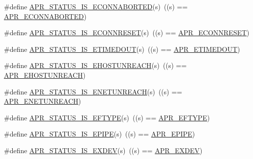 \begin{DoxyCompactItemize}
\item 
\#define \mbox{\hyperlink{group___a_p_r___s_t_a_t_u_s___i_s_ga528a8032b13c75fbdeb9bf7e4c0be493}{A\+P\+R\+\_\+\+S\+T\+A\+T\+U\+S\+\_\+\+I\+S\+\_\+\+E\+C\+O\+N\+N\+A\+B\+O\+R\+T\+ED}}(s)~((s) == \mbox{\hyperlink{group___a_p_r___error_ga9458da18e0ee46a5d37c9cdfdc43efd2}{A\+P\+R\+\_\+\+E\+C\+O\+N\+N\+A\+B\+O\+R\+T\+ED}})
\item 
\#define \mbox{\hyperlink{group___a_p_r___s_t_a_t_u_s___i_s_ga85e2cb1b4c904a9edfbc0d94203f76b6}{A\+P\+R\+\_\+\+S\+T\+A\+T\+U\+S\+\_\+\+I\+S\+\_\+\+E\+C\+O\+N\+N\+R\+E\+S\+ET}}(s)~((s) == \mbox{\hyperlink{group___a_p_r___error_ga264bfe2056e917728e9ed060b58869c2}{A\+P\+R\+\_\+\+E\+C\+O\+N\+N\+R\+E\+S\+ET}})
\item 
\#define \mbox{\hyperlink{group___a_p_r___s_t_a_t_u_s___i_s_ga6adc2f539eabedb504294458be4f6251}{A\+P\+R\+\_\+\+S\+T\+A\+T\+U\+S\+\_\+\+I\+S\+\_\+\+E\+T\+I\+M\+E\+D\+O\+UT}}(s)~((s) == \mbox{\hyperlink{group___a_p_r___error_ga6aeccbe9accb34f0adc1cb1ab9a82a8d}{A\+P\+R\+\_\+\+E\+T\+I\+M\+E\+D\+O\+UT}})
\item 
\#define \mbox{\hyperlink{group___a_p_r___s_t_a_t_u_s___i_s_gad9307ff02e50296c528b79a670dc80bb}{A\+P\+R\+\_\+\+S\+T\+A\+T\+U\+S\+\_\+\+I\+S\+\_\+\+E\+H\+O\+S\+T\+U\+N\+R\+E\+A\+CH}}(s)~((s) == \mbox{\hyperlink{group___a_p_r___error_ga489b0c02fa7cf33ed6d698d385661f86}{A\+P\+R\+\_\+\+E\+H\+O\+S\+T\+U\+N\+R\+E\+A\+CH}})
\item 
\#define \mbox{\hyperlink{group___a_p_r___s_t_a_t_u_s___i_s_ga19911958b3dd62559fb6c245ec579c27}{A\+P\+R\+\_\+\+S\+T\+A\+T\+U\+S\+\_\+\+I\+S\+\_\+\+E\+N\+E\+T\+U\+N\+R\+E\+A\+CH}}(s)~((s) == \mbox{\hyperlink{group___a_p_r___error_gab9b7124a88817d1b69cdef059f7dc689}{A\+P\+R\+\_\+\+E\+N\+E\+T\+U\+N\+R\+E\+A\+CH}})
\item 
\#define \mbox{\hyperlink{group___a_p_r___s_t_a_t_u_s___i_s_gaf37f4f8f6c929728bf55b927576bdb69}{A\+P\+R\+\_\+\+S\+T\+A\+T\+U\+S\+\_\+\+I\+S\+\_\+\+E\+F\+T\+Y\+PE}}(s)~((s) == \mbox{\hyperlink{group___a_p_r___error_gac358701354d03c37e3f0de12ed6d9afc}{A\+P\+R\+\_\+\+E\+F\+T\+Y\+PE}})
\item 
\#define \mbox{\hyperlink{group___a_p_r___s_t_a_t_u_s___i_s_gad1c0cf4e5619025a87c8edfc668d49f6}{A\+P\+R\+\_\+\+S\+T\+A\+T\+U\+S\+\_\+\+I\+S\+\_\+\+E\+P\+I\+PE}}(s)~((s) == \mbox{\hyperlink{group___a_p_r___error_gae985330e30e374714ff1742485597f5d}{A\+P\+R\+\_\+\+E\+P\+I\+PE}})
\item 
\#define \mbox{\hyperlink{group___a_p_r___s_t_a_t_u_s___i_s_ga1a11d6ff007e40f93f9db1b3c6e76617}{A\+P\+R\+\_\+\+S\+T\+A\+T\+U\+S\+\_\+\+I\+S\+\_\+\+E\+X\+D\+EV}}(s)~((s) == \mbox{\hyperlink{group___a_p_r___error_ga0562023bd8ebe580b9bbb9f7b04d3f5d}{A\+P\+R\+\_\+\+E\+X\+D\+EV}})

\end{DoxyCompactItemize}
